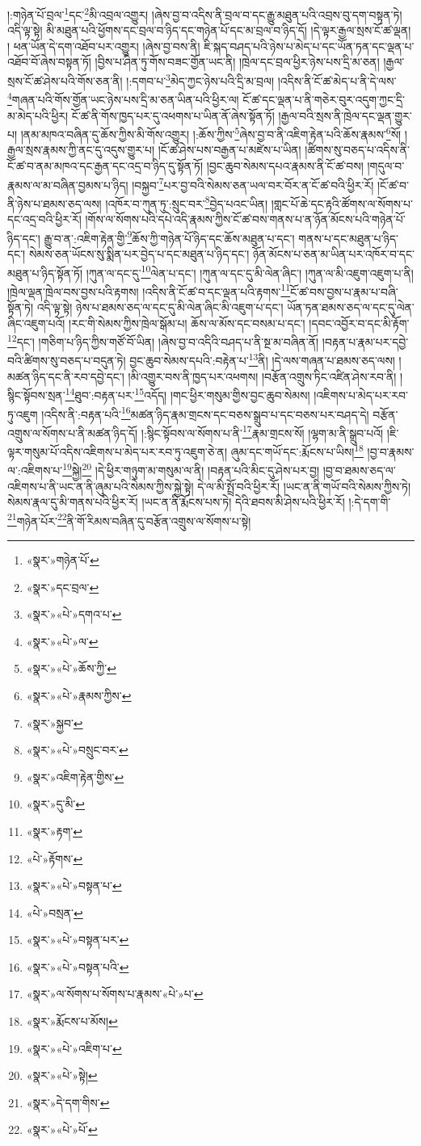 །:གཉེན་པོ་བྲལ་\footnote{«སྣར་»གཉེན་པོ་}དང་\footnote{«སྣར་»དང་བྲལ་}མི་འབྲལ་འགྱུར། །ཞེས་བྱ་བ་འདིས་ནི་བྲལ་བ་དང་རྒྱུ་མཐུན་པའི་འབྲས་བུ་དག་བསྟན་ཏེ། འདི་ལྟ་སྟེ། མི་མཐུན་པའི་ཕྱོགས་དང་བྲལ་བ་ཉིད་དང་གཉེན་པོ་དང་མ་བྲལ་བ་ཉིད་དོ། །དེ་ལྟར་རྒྱལ་སྲས་ངོ་ཚ་ལྡན། །
ཕན་ཡོན་དེ་དག་འཐོབ་པར་འགྱུར། །ཞེས་བྱ་བས་ནི། ཇི་སྐད་བཤད་པའི་ཉེས་པ་མེད་པ་དང་ཡོན་ཏན་དང་ལྡན་པ་འཐོབ་བོ་ཞེས་བསྟན་ཏོ། །བྱིས་པ་ཤིན་ཏུ་གོས་བཟང་གྱོན་ཡང་ནི། །ཁྲེལ་དང་བྲལ་ཕྱིར་ཉེས་པས་དྲི་མ་ཅན། །རྒྱལ་སྲས་ངོ་ཚ་ཤེས་པའི་གོས་ཅན་ནི། །:དགབ་པ་\footnote{«སྣར་»«པེ་»དགའ་པ་}མེད་ཀྱང་ཉེས་པའི་དྲི་མ་བྲལ། །འདིས་ནི་ངོ་ཚ་མེད་པ་ནི་དེ་ལས་\footnote{«སྣར་»«པེ་»ལ་}གཞན་པའི་གོས་གྱོན་ཡང་ཉེས་པས་དྲི་མ་ཅན་ཡིན་པའི་ཕྱིར་ལ། ངོ་ཚ་དང་ལྡན་པ་ནི་གཅེར་བུར་འདུག་ཀྱང་དྲི་མ་མེད་པའི་ཕྱིར། ངོ་ཚ་ནི་གོས་ཁྱད་པར་དུ་འཕགས་པ་ཡིན་ནོ་ཞེས་སྟོན་ཏོ། །རྒྱལ་བའི་སྲས་ནི་ཁྲེལ་དང་ལྡན་གྱུར་པ། །ནམ་མཁའ་བཞིན་དུ་ཆོས་ཀྱིས་མི་གོས་འགྱུར། །:ཆོས་ཀྱིས་\footnote{«སྣར་»«པེ་»ཆོས་ཀྱི་}ཞེས་བྱ་བ་ནི་འཇིག་རྟེན་པའི་ཆོས་རྣམས་\footnote{«སྣར་»«པེ་»རྣམས་ཀྱིས་}སོ། །རྒྱལ་སྲས་རྣམས་ཀྱི་ནང་དུ་འདུས་གྱུར་པ། །ངོ་ཚ་ཤེས་པས་བརྒྱན་པ་མཛེས་པ་ཡིན། །ཚིགས་སུ་བཅད་པ་འདིས་ནི་ངོ་ཚ་བ་ནམ་མཁའ་དང་རྒྱན་དང་འདྲ་བ་ཉིད་དུ་སྟོན་ཏོ། །བྱང་ཆུབ་སེམས་དཔའ་རྣམས་ནི་ངོ་ཚ་བས། །གདུལ་བ་རྣམས་ལ་མ་བཞིན་བྱམས་པ་ཉིད། །བསྐྱབ་\footnote{«སྣར་»སྐྱབ་}པར་བྱ་བའི་སེམས་ཅན་ཡལ་བར་བོར་ན་ངོ་ཚ་བའི་ཕྱིར་རོ། །ངོ་ཚ་བ་ནི་ཉེས་པ་ཐམས་ཅད་ལས། །འཁོར་བ་ཀུན་ཏུ་:སྲུང་བར་\footnote{«སྣར་»«པེ་»བསྲུང་བར་}བྱེད་པའང་ཡིན། །གླང་པོ་ཆེ་དང་རྟའི་ཚོགས་ལ་སོགས་པ་དང་འདྲ་བའི་ཕྱིར་རོ། །གོས་ལ་སོགས་པའི་དཔེ་འདི་རྣམས་ཀྱིས་ངོ་ཚ་བས་གནས་པ་ན་ཉོན་མོངས་པའི་གཉེན་པོ་ཉིད་དང་། རྒྱུ་བ་ན་:འཇིག་རྟེན་གྱི་\footnote{«སྣར་»འཇིག་རྟེན་གྱིས་}ཆོས་ཀྱི་གཉེན་པོ་ཉིད་དང་ཆོས་མཐུན་པ་དང་། གནས་པ་དང་མཐུན་པ་ཉིད་དང་། སེམས་ཅན་ཡོངས་སུ་སྨིན་པར་བྱེད་པ་དང་མཐུན་པ་ཉིད་དང་། ཉོན་མོངས་པ་ཅན་མ་ཡིན་པར་འཁོར་བ་དང་མཐུན་པ་ཉིད་སྟོན་ཏོ། །ཀུན་ལ་དང་དུ་\footnote{«སྣར་»དུ་མི་}ལེན་པ་དང་། །ཀུན་ལ་དང་དུ་མི་ལེན་ཞིང་། །ཀུན་ལ་མི་འཇུག་འཇུག་པ་ནི། །ཁྲེལ་ལྡན་ཁྲེལ་བས་བྱས་པའི་རྟགས། །འདིས་ནི་ངོ་ཚ་བ་དང་ལྡན་པའི་རྟགས་\footnote{«སྣར་»རྟག་}ངོ་ཚ་བས་བྱས་པ་རྣམ་པ་བཞི་སྟོན་ཏེ། འདི་ལྟ་སྟེ། ཉེས་པ་ཐམས་ཅད་ལ་དང་དུ་མི་ལེན་ཞིང་མི་འཇུག་པ་དང་། ཡོན་ཏན་ཐམས་ཅད་ལ་དང་དུ་ལེན་ཞིང་འཇུག་པའོ། །རང་གི་སེམས་ཀྱིས་ཁྲེལ་སྒོམ་པ། ཆོས་ལ་མོས་དང་བསམ་པ་དང་། །དབང་འབྱོར་བ་དང་མི་རྟོག་\footnote{«པེ་»རྟོགས་}དང་། །གཅིག་པ་ཉིད་ཀྱིས་གཙོ་བོ་ཡིན། །ཞེས་བྱ་བ་འདིའི་བཤད་པ་ནི་སྔ་མ་བཞིན་ནོ། །བརྟན་པ་རྣམ་པར་དབྱེ་བའི་ཚིགས་སུ་བཅད་པ་བདུན་ཏེ། བྱང་ཆུབ་སེམས་དཔའི་:བརྟེན་པ་\footnote{«སྣར་»«པེ་»བསྟན་པ་}ནི། །དེ་ལས་གཞན་པ་ཐམས་ཅད་ལས། །མཚན་ཉིད་དང་ནི་རབ་དབྱེ་དང་། །མི་འགྱུར་བས་ནི་ཁྱད་པར་འཕགས། །བརྩོན་འགྲུས་ཏིང་འཛིན་ཤེས་རབ་ནི། །སྙིང་སྟོབས་སྲན་\footnote{«པེ་»བསྲན་}ཐུབ་:བརྟན་པར་\footnote{«སྣར་»«པེ་»བསྟན་པར་}འདོད། །གང་ཕྱིར་གསུམ་གྱིས་བྱང་ཆུབ་སེམས། །འཇིགས་པ་མེད་པར་རབ་ཏུ་འཇུག །འདིས་ནི་:བརྟན་པའི་\footnote{«སྣར་»«པེ་»བསྟན་པའི་}མཚན་ཉིད་རྣམ་གྲངས་དང་བཅས་སྒྲུབ་པ་དང་བཅས་པར་བཤད་དེ། བརྩོན་འགྲུས་ལ་སོགས་པ་ནི་མཚན་ཉིད་དོ། །:སྙིང་སྟོབས་ལ་སོགས་པ་ནི་\footnote{«སྣར་»ལ་སོགས་པ་སོགས་པ་རྣམས་«པེ་»པ་}རྣམ་གྲངས་སོ། །ལྷག་མ་ནི་སྒྲུབ་པའོ། །ཇི་ལྟར་གསུམ་པོ་འདིས་འཇིགས་པ་མེད་པར་རབ་ཏུ་འཇུག་ཅེ་ན། ཞུམ་དང་གཡོ་དང་:རྨོངས་པ་ཡིས།\footnote{«སྣར་»རྨོངས་པ་མོས།} །བྱ་བ་རྣམས་ལ་:འཇིགས་པ་\footnote{«སྣར་»«པེ་»འཇིག་པ་}སྐྱེ།\footnote{«སྣར་»«པེ་»སྟེ།} །དེ་ཕྱིར་གཉུག་མ་གསུམ་ལ་ནི། །བརྟན་པའི་མིང་དུ་ཤེས་པར་བྱ། །བྱ་བ་ཐམས་ཅད་ལ་འཇིགས་པ་ནི་ཡང་ན་ནི་ཞུམ་པའི་སེམས་ཀྱིས་སྐྱེ་སྟེ། དེ་ལ་མི་སྤྲོ་བའི་ཕྱིར་རོ། །ཡང་ན་ནི་གཡོ་བའི་སེམས་ཀྱིས་ཏེ། སེམས་རྣལ་དུ་མི་གནས་པའི་ཕྱིར་རོ། །ཡང་ན་ནི་རྨོངས་པས་ཏེ། དེའི་ཐབས་མི་ཤེས་པའི་ཕྱིར་རོ། །:དེ་དག་གི་\footnote{«སྣར་»དེ་དག་གིས་}གཉེན་པོར་\footnote{«སྣར་»«པེ་»པོ་}ནི་གོ་རིམས་བཞིན་དུ་བརྩོན་འགྲུས་ལ་སོགས་པ་སྟེ། 